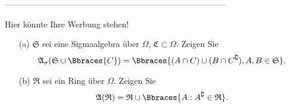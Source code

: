 --------------------------------------------------------------------------------

\begin{exercise}

Hier könnte Ihre Werbung stehen!

\begin{itemize}
  \item[(a)] $\mathfrak{S}$ sei eine Sigmaalgebra über $\Omega$, $\mathfrak{C} \subset \Omega$. Zeigen Sie
  \begin{align*}
    \mathfrak{A}_\sigma(\mathfrak{S} \cup \Bbraces{C}) =
    \Bbraces{(A \cap C) \cup (B \cap C^\complement), A, B \in \mathfrak{S}}.
  \end{align*}
  \item[(b)] $\mathfrak{R}$ sei ein Ring über $\Omega$. Zeigen Sie
  \begin{align*}
    \mathfrak{A}(\mathfrak{R}) =
    \mathfrak{R} \cup \Bbraces{A: A^\complement \in \mathfrak{R}}.
  \end{align*}
\end{itemize}

\end{exercise}

